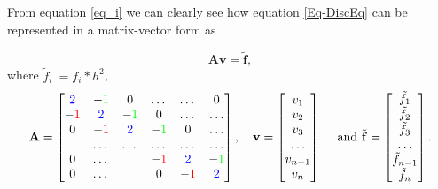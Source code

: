 \documentclass[a4paper]{article}
\begin{document}
From equation \eqref{eq_i} we can clearly see how equation \eqref{Eq-DiscEq} can be represented in a matrix-vector form as

\begin{equation}
   \mathbf{A}\mathbf{v} = \tilde{\mathbf{f}},
   \label{mateq1}
\end{equation}
where $\tilde{f}_i\ = f_i*h^2$,
\[
    \mathbf{A} = \begin{bmatrix}
                           \color{blue}2\color{black}& -\color{green}1\color{black}& 0 &\dots   & \dots &0 \\
                           -\color{red}1\color{black} & \color{blue}2\color{black} & -\color{green}1\color{black} &0 &\dots &\dots \\
                           0&-\color{red}1\color{black} &\color{blue}2\color{black} & -\color{green}1\color{black} & 0 & \dots \\
                           & \dots   & \dots &\dots   &\dots & \dots \\
                           0&\dots   &  &-\color{red}1\color{black} &\color{blue}2\color{black}& -\color{green}1\color{black} \\
                           0&\dots    &  & 0  &-\color{red}1\color{black} & \color{blue}2\color{black} \\
                      \end{bmatrix}, \quad \mathbf{v}=\begin{bmatrix}
                           v_1\\
                           v_2\\
                           v_3 \\
                          \dots  \\
                           v_{n-1}\\
                           v_n\\
                      \end{bmatrix} \quad \text{ and } \tilde{\mathbf{f}}=\begin{bmatrix}
                           \tilde{f}_1\\
                           \tilde{f}_2\\
                           \tilde{f}_3 \\
                           \dots \\
                          \tilde{f}_{n-1} \\
                           \tilde{f}_n\\
                      \end{bmatrix}.
\]
\end{document}
